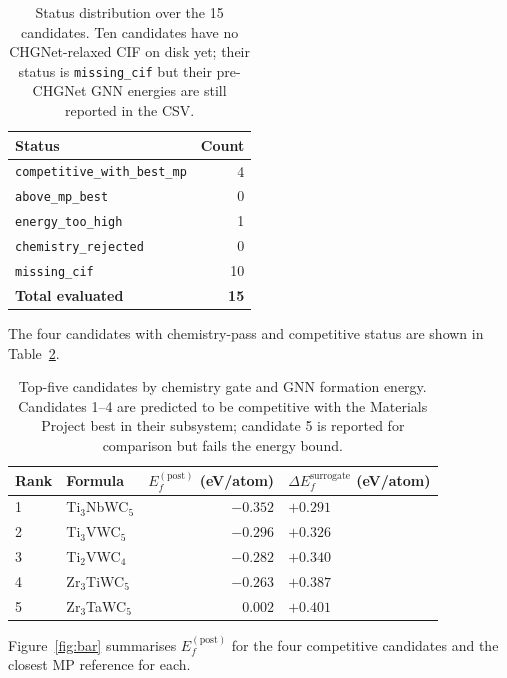 \documentclass[11pt,a4paper]{article}
\begin{document}
\begin{table}[ht]
\centering
\begin{tabular}{lr}
\toprule
\textbf{Status} & \textbf{Count}\\
\midrule
\texttt{competitive\_with\_best\_mp}        & 4\\
\texttt{above\_mp\_best}                   & 0\\
\texttt{energy\_too\_high}                 & 1\\
\texttt{chemistry\_rejected}               & 0\\
\texttt{missing\_cif}                      & 10\\
\midrule
\textbf{Total evaluated}                    & \textbf{15}\\
\bottomrule
\end{tabular}
\caption{Status distribution over the 15 candidates. Ten candidates
have no CHGNet-relaxed CIF on disk yet; their status is
\texttt{missing\_cif} but their pre-CHGNet GNN energies are still
reported in the CSV.}
\label{tab:status}
\end{table}

The four candidates with chemistry-pass and competitive status are
shown in Table~\ref{tab:top5}.

\begin{table}[ht]
\centering
\begin{tabular}{llrl}
\toprule
\textbf{Rank} & \textbf{Formula} &
\textbf{$E_f^{(\mathrm{post})}$ (eV/atom)} &
\textbf{$\Delta E_f^{\mathrm{surrogate}}$ (eV/atom)} \\
\midrule
1 & Ti$_3$NbWC$_5$ & $-0.352$ & $+0.291$ \\
2 & Ti$_3$VWC$_5$  & $-0.296$ & $+0.326$ \\
3 & Ti$_2$VWC$_4$  & $-0.282$ & $+0.340$ \\
4 & Zr$_3$TiWC$_5$ & $-0.263$ & $+0.387$ \\
\midrule
5 & Zr$_3$TaWC$_5$ & $\phantom{-}0.002$ & $+0.401$ \\
\bottomrule
\end{tabular}
\caption{Top-five candidates by chemistry gate and GNN formation
energy. Candidates 1--4 are predicted to be competitive with the
Materials Project best in their subsystem; candidate 5 is reported
for comparison but fails the energy bound.}
\label{tab:top5}
\end{table}

Figure~\ref{fig:bar} summarises $E_f^{(\mathrm{post})}$ for the four
competitive candidates and the closest MP reference for each.
\end{document}
